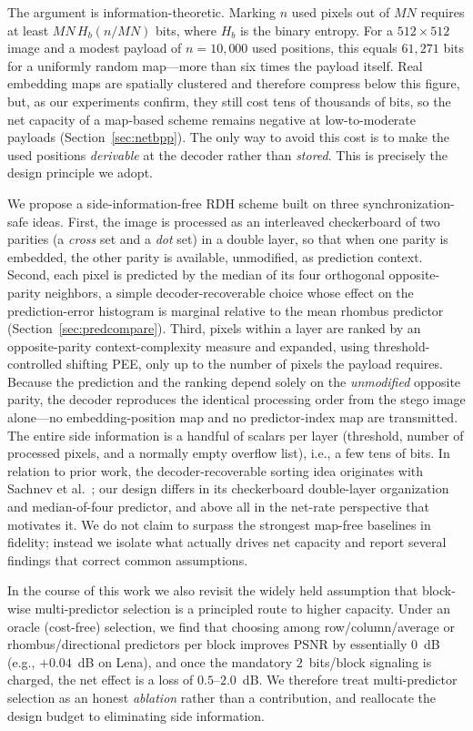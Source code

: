 \documentclass[journal,article,submit,pdftex,moreauthors]{Definitions/mdpi}
\begin{document}
The argument is information-theoretic. Marking $n$ used pixels out of $MN$ requires at least $MN\,H_b(n/MN)$ bits, where $H_b$ is the binary entropy. For a $512\times512$ image and a modest payload of $n=10{,}000$ used positions, this equals $61{,}271$ bits for a uniformly random map---more than six times the payload itself. Real embedding maps are spatially clustered and therefore compress below this figure, but, as our experiments confirm, they still cost tens of thousands of bits, so the net capacity of a map-based scheme remains negative at low-to-moderate payloads (Section~\ref{sec:netbpp}). The only way to avoid this cost is to make the used positions \emph{derivable} at the decoder rather than \emph{stored}. This is precisely the design principle we adopt.

We propose a side-information-free RDH scheme built on three synchronization-safe ideas. First, the image is processed as an interleaved checkerboard of two parities (a \emph{cross} set and a \emph{dot} set) in a double layer, so that when one parity is embedded, the other parity is available, unmodified, as prediction context. Second, each pixel is predicted by the median of its four orthogonal opposite-parity neighbors, a simple decoder-recoverable choice whose effect on the prediction-error histogram is marginal relative to the mean rhombus predictor (Section~\ref{sec:predcompare}). Third, pixels within a layer are ranked by an opposite-parity context-complexity measure and expanded, using threshold-controlled shifting PEE, only up to the number of pixels the payload requires. Because the prediction and the ranking depend solely on the \emph{unmodified} opposite parity, the decoder reproduces the identical processing order from the stego image alone---no embedding-position map and no predictor-index map are transmitted. The entire side information is a handful of scalars per layer (threshold, number of processed pixels, and a normally empty overflow list), i.e., a few tens of bits. In relation to prior work, the decoder-recoverable sorting idea originates with Sachnev et al.~\cite{Sachnev2009}; our design differs in its checkerboard double-layer organization and median-of-four predictor, and above all in the net-rate perspective that motivates it. We do not claim to surpass the strongest map-free baselines in fidelity; instead we isolate what actually drives net capacity and report several findings that correct common assumptions.

In the course of this work we also revisit the widely held assumption that block-wise multi-predictor selection is a principled route to higher capacity. Under an oracle (cost-free) selection, we find that choosing among row/column/average or rhombus/directional predictors per block improves PSNR by essentially $0$~dB (e.g., $+0.04$~dB on Lena), and once the mandatory $2$~bits/block signaling is charged, the net effect is a loss of $0.5$--$2.0$~dB. We therefore treat multi-predictor selection as an honest \emph{ablation} rather than a contribution, and reallocate the design budget to eliminating side information.
\end{document}
